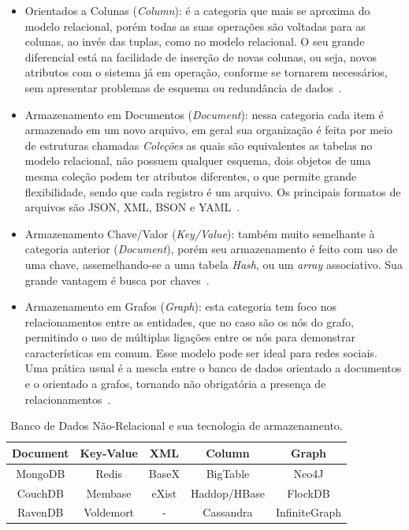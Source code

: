 \begin{itemize}
\item Orientados a Colunas (\textit{Column}): é a categoria que mais se aproxima do modelo relacional, porém todas as suas operações são voltadas para as colunas, ao invés das tuplas, como no modelo relacional. O seu grande diferencial está na facilidade de inserção de novas colunas, ou seja, novos atributos com o sistema já em operação, conforme se tornarem necessários, sem apresentar problemas de esquema ou redundância de dados~\cite{vaish2013getting}.

\item Armazenamento em Documentos (\textit{Document}): nessa categoria cada item é armazenado em um novo arquivo, em geral sua organização é feita por meio de estruturas chamadas \textit{Coleções} as quais são equivalentes as tabelas no modelo relacional, não possuem qualquer esquema, dois objetos de uma mesma coleção podem ter atributos diferentes, o que permite grande flexibilidade, sendo que cada registro é um arquivo. Os principais formatos de arquivos são JSON, XML, BSON e YAML~\cite{vaish2013getting}.

\item Armazenamento Chave/Valor (\textit{Key/Value}): também muito semelhante à categoria anterior (\textit{Document}), porém seu armazenamento é feito com uso de uma chave, assemelhando-se a uma tabela \textit{Hash}, ou um \textit{array} associativo. Sua grande vantagem é busca por chaves~\cite{vaish2013getting}.

\item Armazenamento em Grafos (\textit{Graph}): esta categoria tem foco nos relacionamentos entre as entidades, que no caso são os nós do grafo, permitindo o uso de múltiplas ligações entre os nós para demonstrar características em comum. Esse modelo pode ser ideal para redes sociais. Uma prática usual é a mescla entre o banco de dados orientado a documentos e o orientado a grafos, tornando não obrigatória a presença de relacionamentos~\cite{vaish2013getting}.

\end{itemize}

\begin{table}[!htb]
\centering
\caption{Banco de Dados Não-Relacional e sua tecnologia de armazenamento.}\label{tab:01}
\begin{tabular}{c|c|c|c|c}
\hline
\textbf{Document} & \textbf{Key-Value} & \textbf{XML} & \textbf{Column} & \textbf{Graph}\\ 
\hline                               
MongoDB & Redis & BaseX & BigTable & Neo4J \\
\hline
CouchDB & Membase & eXist & Haddop/HBase & FlockDB \\
\hline
RavenDB & Voldemort & - & Cassandra & InfiniteGraph \\
\hline
\end{tabular}
\end{table}
\normalsize

